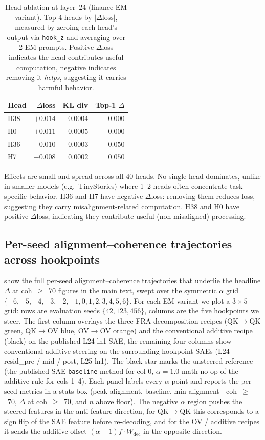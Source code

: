 \documentclass{article}
\theoremstyle{plain}
\theoremstyle{definition}
\theoremstyle{remark}
\begin{document}
\begin{table}[h]
\caption{Head ablation at layer~24 (finance EM variant). Top 4 heads by $|\Delta\text{loss}|$, measured by zeroing each head's output via \texttt{hook\_z} and averaging over 2 EM prompts. Positive $\Delta$loss indicates the head contributes useful computation, negative indicates removing it \emph{helps}, suggesting it carries harmful behavior.}
\label{tab:head_ablation}
\centering
\begin{tabular}{lrrr}
\toprule
Head & $\Delta$loss & KL div & Top-1 $\Delta$ \\
\midrule
H38 & $+0.014$ & $0.0004$ & $0.000$ \\
H0  & $+0.011$ & $0.0005$ & $0.000$ \\
H36 & $-0.010$ & $0.0003$ & $0.050$ \\
H7  & $-0.008$ & $0.0002$ & $0.050$ \\
\bottomrule
\end{tabular}
\end{table}

Effects are small and spread across all 40 heads. No single head dominates, unlike in smaller models (e.g.\ TinyStories) where 1--2 heads often concentrate task-specific behavior. H36 and H7 have negative $\Delta$loss: removing them reduces loss, suggesting they carry misalignment-related computation. H38 and H0 have positive $\Delta$loss, indicating they contribute useful (non-misaligned) processing.

\subsection{Per-seed alignment--coherence trajectories across hookpoints}\label{app:seed_grid}

 show the full per-seed alignment--coherence trajectories that underlie the headline $\Delta$ at coh~$\geq$~70 figures in the main text, swept over the symmetric $\alpha$ grid $\{-6, -5, -4, -3, -2, -1, 0, 1, 2, 3, 4, 5, 6\}$. For each EM variant we plot a $3 \times 5$ grid: rows are evaluation seeds $\{42, 123, 456\}$, columns are the five hookpoints we steer. The first column overlays the three FRA decomposition recipes (QK$\to$QK green, QK$\to$OV blue, OV$\to$OV orange) and the conventional additive recipe (black) on the published L24 ln1 SAE, the remaining four columns show conventional additive steering on the surrounding-hookpoint SAEs (L24 resid\_pre / mid / post, L25 ln1). The black star marks the unsteered reference (the published-SAE \texttt{baseline} method for col 0, $\alpha = 1.0$ math no-op of the additive rule for cols 1--4). Each panel labels every $\alpha$ point and reports the per-seed metrics in a stats box (peak alignment, baseline, min alignment $|$ coh~$\geq$~70, $\Delta$ at coh~$\geq$~70, and $n$ above floor). The negative $\alpha$ region pushes the steered features in the anti-feature direction, for QK$\to$QK this corresponds to a sign flip of the SAE feature before re-decoding, and for the OV / additive recipes it sends the additive offset $(\alpha-1) f \cdot W_{\mathrm{dec}}$ in the opposite direction.
\end{document}
